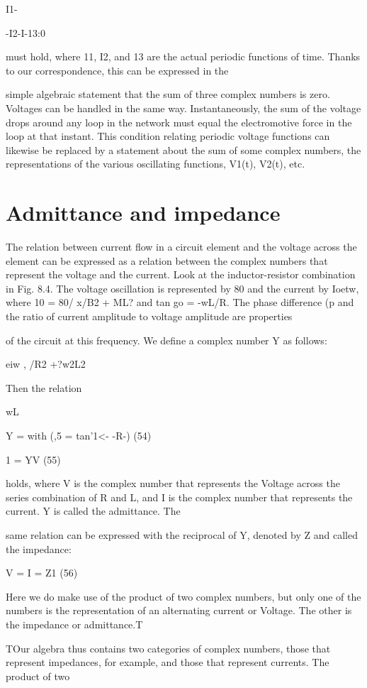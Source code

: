 I1-{-I2-I-13:0 

must hold, where 11, I2, and 13 are the actual periodic functions of
time. Thanks to our correspondence, this can be expressed in the

simple algebraic statement that the sum of three complex numbers
is zero. Voltages can be handled in the same way. Instantaneously,
the sum of the voltage drops around any loop in the network must
equal the electromotive force in the loop at that instant. This condition
relating periodic voltage functions can likewise be replaced by
a statement about the sum of some complex numbers, the representations
of the various oscillating functions, V1(t), V2(t), etc.

\section{Admittance and impedance}

The relation between current flow in a circuit element and the
voltage across the element can be expressed as a relation between the
complex numbers that represent the voltage and the current. Look
at the inductor-resistor combination in Fig. 8.4. The voltage oscillation
is represented by 80 and the current by Ioetw, where 10 =
80/ x/B2 + ML? and tan go = -wL/R. The phase difference (p and
the ratio of current amplitude to voltage amplitude are properties

of the circuit at this frequency. We define a complex number Y as
follows:

eiw
, /R2 +?w2L2

Then the relation

wL

Y = with (,5 = tan'1<- -R-) (54)

1 = YV (55)

holds, where V is the complex number that represents the Voltage
across the series combination of R and L, and I is the complex number
that represents the current. Y is called the admittance. The

same relation can be expressed with the reciprocal of Y, denoted by
Z and called the impedance:

V =  I = Z1 (56)

Here we do make use of the product of two complex numbers, but
only one of the numbers is the representation of an alternating current
or Voltage. The other is the impedance or admittance.T

TOur algebra thus contains two categories of complex numbers, those that represent
impedances, for example, and those that represent currents. The product of two

}

